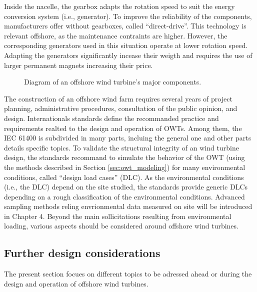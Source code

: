 Inside the nacelle, the gearbox adapts the rotation speed to suit the energy conversion system (i.e., generator). 
To improve the reliability of the components, manufacturers offer without gearboxes, called ``direct-drive''. 
This technology is relevant offshore, as the maintenance contraints are higher. 
However, the corresponding generators used in this situation operate at lower rotation speed. 
Adapting the generators significantly incease their weigth and requires the use of larger permanent magnets increasing their price.   

\begin{figure}
    \centering
    
    \caption{Diagram of an offshore wind turbine's major components.}
    \label{fig:owt_diagram}
\end{figure}

The construction of an offshore wind farm requires several years of project planning, administrative procedures, consultation of the public opinion, and design. 
Internationals standards define the recommanded practice and requirements realted to the design and operation of OWTs. 
Among them, the IEC 61400 is subdivided in many parts, incluing the general one \citep{iec_2019} and other parts details specific topics.       
To validate the structural integrity of an wind turbine design, the standards recommand to simulate the behavior of the OWT (using the methods described in Section \ref{sec:owt_modeling}) for many environmental conditions, called ``design load cases'' (DLC). 
As the environmental conditions (i.e., the DLC) depend on the site studied, the standards provide generic DLCs depending on a rough classification of the environmental conditions. 
Advanced sampling methods reling envrionmental data measured on site will be introduced in Chapter 4. 
Beyond the main sollicitations resulting from environmental loading, various aspects should be considered around offshore wind turbines. 


\subsection{Further design considerations}
The present section focues on different topics to be adressed ahead or during the design and operation of offshore wind turbines.

